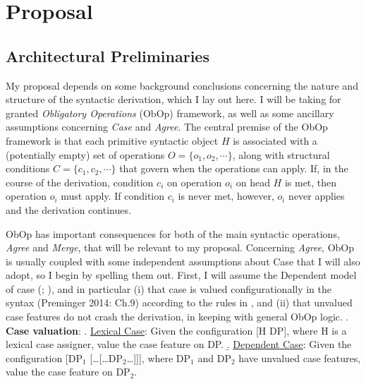 \documentclass[11pt, letterpaper]{paper_nick}
\begin{document}
\begin{comment}
\end{itemize}
\item \underline{Feature-driven merge} (\citealt{adger03}; \citealt{collins03}; \citealt{lechner04}; \citealt{kobele06}; \citealt{pesetsky07}; \citealt{muller10})
\begin{itemize}
\item Unify \emph{Agree}, \emph{Internal Merge}, \emph{External Merge} as feature driven operations
\item Two types of features:
\begin{itemize}
\item Structure building, which triggers \emph{Merge}: [$\circ$ F $\circ$] 
\item Probing, which triggers \emph{Agree}: [$*$ F $*$] 
\end{itemize}
\end{itemize}
\end{enumerate}
\end{comment}

\section{Proposal}
\subsection{Architectural Preliminaries}
My proposal depends on some background conclusions concerning the nature and structure of the syntactic derivation, which I lay out here. I will be taking for granted  \emph{Obligatory Operations} (ObOp) framework, as well as some ancillary assumptions concerning \emph{Case} and \emph{Agree}. The central premise of the ObOp framework is that each primitive syntactic object $H$ is associated with a (potentially empty) set of operations $O=\{o_1, o_2, \cdots\}$, along with structural conditions $C=\{c_1, c_2, \cdots\}$ that govern when the operations can apply. If, in the course of the derivation, condition $c_i$ on operation $o_i$ on head $H$ is met, then operation $o_i$ must apply. If condition $c_i$ is never met, however, $o_i$ never applies and the derivation continues. 

ObOp has important consequences for both of the main syntactic operations, \emph{Agree} and \emph{Merge}, that will be relevant to my proposal. Concerning \emph{Agree}, ObOp is usually coupled with some independent assumptions about Case that I will also adopt, so I begin by spelling them out. First, I will assume the Dependent model of case (\citealt{marantz84}; \citealt{bobaljik08}), and in particular (i) that case is valued configurationally in the syntax (Preminger 2014: Ch.9) according to the rules in \Next, and (ii) that unvalued case features do not crash the derivation, in keeping with general ObOp logic. 
\ex. \textbf{Case valuation}:
\a. \underline{Lexical Case}: Given the configuration [H DP], where H is a lexical case assigner, value the case feature on DP. 
\b. \underline{Dependent Case}: Given the configuration [DP$_1$ [\ldots[\ldots DP$_2$\ldots]]], where DP$_1$ and DP$_2$ have unvalued case features, value the case feature on DP$_2$. 
 
\end{document}

